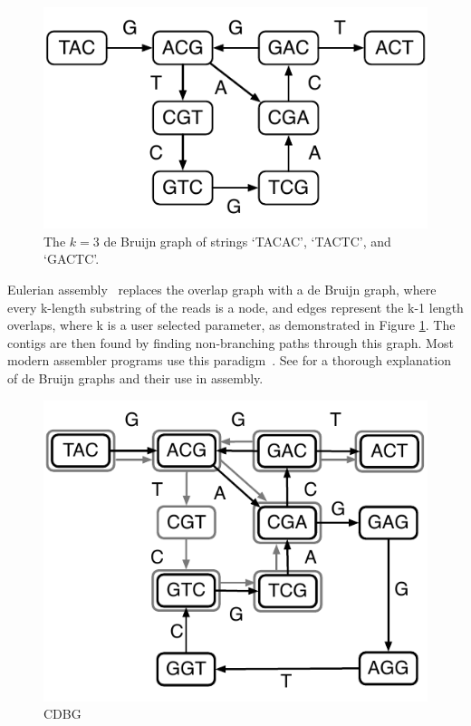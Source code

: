 
\begin{figure}[!hbt]
	\begin{center}
		\includegraphics[scale=0.7]{images/dbg.pdf}
		\caption{The $k=3$ de Bruijn graph of strings `TACAC', `TACTC', and
			`GACTC'.}
		\label{figure:dbg}
	\end{center}
\end{figure}

Eulerian assembly~\cite{IW95, PTW} replaces the overlap graph with a de Bruijn graph, where every k-length substring of the reads is a node, and edges represent the k-1 length overlaps, where k is a user selected parameter, as demonstrated in Figure \ref{figure:dbg}. The contigs are then found by finding non-branching paths through this graph. Most modern assembler programs use this paradigm~\cite{bankevich2012spades,peng2010idba,Li:2010,Simpson:2009,Butler:2008,SahShi12,MacPrz09,ZerBir08}. See \cite{compeau11} for a thorough explanation of de Bruijn graphs and their use in assembly.



\begin{figure}[!hbt]
	\begin{center}
		\includegraphics*[scale=0.70]{images/cdbg.pdf}
		\caption{CDBG}
		\label{figure:cdbg}
	\end{center}
\end{figure}


